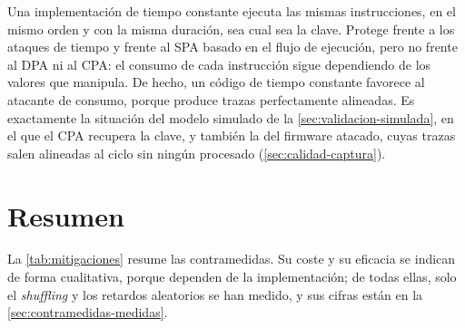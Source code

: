 Una implementación de tiempo constante ejecuta las mismas instrucciones, en el
mismo orden y con la misma duración, sea cual sea la clave. Protege frente a los
ataques de tiempo \cite{kocher1996timing} y frente al SPA basado en el flujo de
ejecución, pero no frente al DPA ni al CPA: el consumo de cada instrucción sigue
dependiendo de los valores que manipula. De hecho, un código de tiempo constante
favorece al atacante de consumo, porque produce trazas perfectamente alineadas.
Es exactamente la situación del modelo simulado de la
\cref{sec:validacion-simulada}, en el que el CPA recupera la clave, y también
la del firmware atacado, cuyas trazas salen alineadas al ciclo sin ningún
procesado (\cref{sec:calidad-captura}).

\section{Resumen}
\label{sec:resumen-mitigaciones}

La \cref{tab:mitigaciones} resume las contramedidas. Su coste y su eficacia se
indican de forma cualitativa, porque dependen de la implementación; de todas
ellas, solo el \emph{shuffling} y los retardos aleatorios se han medido, y sus
cifras están en la \cref{sec:contramedidas-medidas}.

